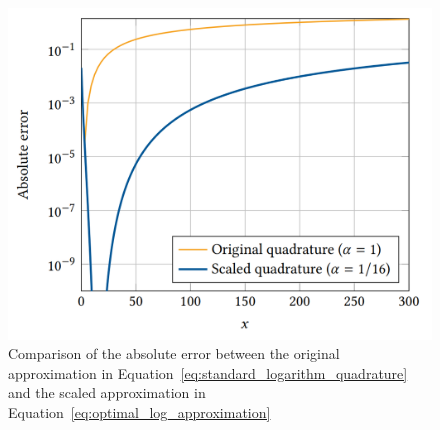 \begin{figure}[ht]
	\centering
    \includegraphics[width=12cm]{figures/comp_errs.png}
	\caption{Comparison of the absolute error between the original approximation in Equation~\ref{eq:standard_logarithm_quadrature} and the scaled approximation in Equation~\ref{eq:optimal_log_approximation}}
	\label{fig:log_error_comparison}
\end{figure}

